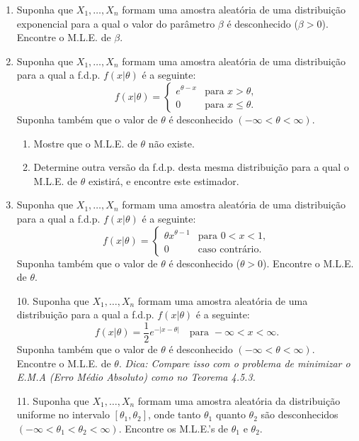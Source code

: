\begin{enumerate}
    \item Suponha que $X_1, \dots, X_n$ formam uma amostra aleatória de uma distribuição exponencial para a qual o valor do parâmetro $\beta$ é desconhecido ($\beta > 0$). Encontre o M.L.E. de $\beta$.

    \item Suponha que $X_1, \dots, X_n$ formam uma amostra aleatória de uma distribuição para a qual a f.d.p. $f(x|\theta)$ é a seguinte:
    $$ f(x|\theta) = \begin{cases} e^{\theta - x} & \text{para } x > \theta, \\ 0 & \text{para } x \le \theta. \end{cases} $$
    Suponha também que o valor de $\theta$ é desconhecido $(-\infty < \theta < \infty)$.
    \begin{enumerate}
        \item Mostre que o M.L.E. de $\theta$ não existe.
        \item Determine outra versão da f.d.p. desta mesma distribuição para a qual o M.L.E. de $\theta$ existirá, e encontre este estimador.
    \end{enumerate}

    \item Suponha que $X_1, \dots, X_n$ formam uma amostra aleatória de uma distribuição para a qual a f.d.p. $f(x|\theta)$ é a seguinte:
    $$ f(x|\theta) = \begin{cases} \theta x^{\theta-1} & \text{para } 0 < x < 1, \\ 0 & \text{caso contrário}. \end{cases} $$
    Suponha também que o valor de $\theta$ é desconhecido ($\theta > 0$). Encontre o M.L.E. de $\theta$.
    
    \item[10.] Suponha que $X_1, \dots, X_n$ formam uma amostra aleatória de uma distribuição para a qual a f.d.p. $f(x|\theta)$ é a seguinte:
    $$ f(x|\theta) = \frac{1}{2} e^{-|x-\theta|} \quad \text{para } -\infty < x < \infty. $$
    Suponha também que o valor de $\theta$ é desconhecido $(-\infty < \theta < \infty)$. Encontre o M.L.E. de $\theta$. \textit{Dica: Compare isso com o problema de minimizar o E.M.A (Erro Médio Absoluto) como no Teorema 4.5.3.}

    \item[11.] Suponha que $X_1, \dots, X_n$ formam uma amostra aleatória da distribuição uniforme no intervalo $[\theta_1, \theta_2]$, onde tanto $\theta_1$ quanto $\theta_2$ são desconhecidos $(-\infty < \theta_1 < \theta_2 < \infty)$. Encontre os M.L.E.'s de $\theta_1$ e $\theta_2$.


\end{enumerate}

